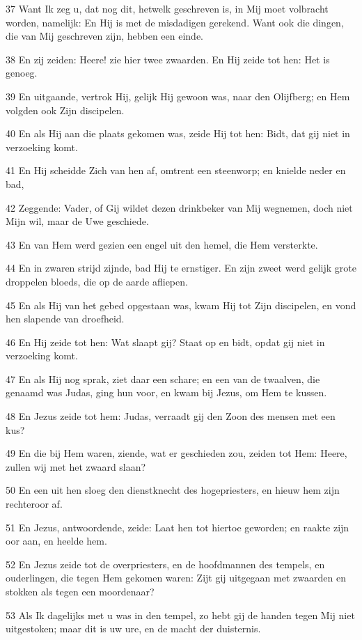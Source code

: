 \par 37 Want Ik zeg u, dat nog dit, hetwelk geschreven is, in Mij moet volbracht worden, namelijk: En Hij is met de misdadigen gerekend. Want ook die dingen, die van Mij geschreven zijn, hebben een einde.
\par 38 En zij zeiden: Heere! zie hier twee zwaarden. En Hij zeide tot hen: Het is genoeg.
\par 39 En uitgaande, vertrok Hij, gelijk Hij gewoon was, naar den Olijfberg; en Hem volgden ook Zijn discipelen.
\par 40 En als Hij aan die plaats gekomen was, zeide Hij tot hen: Bidt, dat gij niet in verzoeking komt.
\par 41 En Hij scheidde Zich van hen af, omtrent een steenworp; en knielde neder en bad,
\par 42 Zeggende: Vader, of Gij wildet dezen drinkbeker van Mij wegnemen, doch niet Mijn wil, maar de Uwe geschiede.
\par 43 En van Hem werd gezien een engel uit den hemel, die Hem versterkte.
\par 44 En in zwaren strijd zijnde, bad Hij te ernstiger. En zijn zweet werd gelijk grote droppelen bloeds, die op de aarde afliepen.
\par 45 En als Hij van het gebed opgestaan was, kwam Hij tot Zijn discipelen, en vond hen slapende van droefheid.
\par 46 En Hij zeide tot hen: Wat slaapt gij? Staat op en bidt, opdat gij niet in verzoeking komt.
\par 47 En als Hij nog sprak, ziet daar een schare; en een van de twaalven, die genaamd was Judas, ging hun voor, en kwam bij Jezus, om Hem te kussen.
\par 48 En Jezus zeide tot hem: Judas, verraadt gij den Zoon des mensen met een kus?
\par 49 En die bij Hem waren, ziende, wat er geschieden zou, zeiden tot Hem: Heere, zullen wij met het zwaard slaan?
\par 50 En een uit hen sloeg den dienstknecht des hogepriesters, en hieuw hem zijn rechteroor af.
\par 51 En Jezus, antwoordende, zeide: Laat hen tot hiertoe geworden; en raakte zijn oor aan, en heelde hem.
\par 52 En Jezus zeide tot de overpriesters, en de hoofdmannen des tempels, en ouderlingen, die tegen Hem gekomen waren: Zijt gij uitgegaan met zwaarden en stokken als tegen een moordenaar?
\par 53 Als Ik dagelijks met u was in den tempel, zo hebt gij de handen tegen Mij niet uitgestoken; maar dit is uw ure, en de macht der duisternis.
